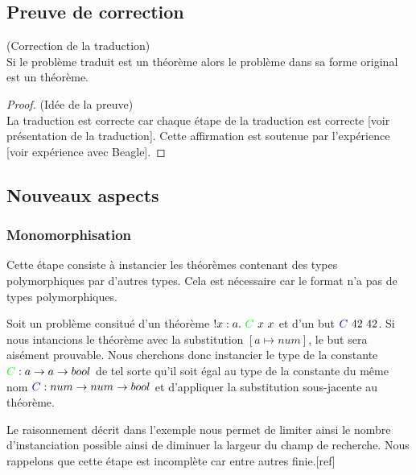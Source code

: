 \subsection{Preuve de correction}

\begin{thm}(Correction de la traduction)
\\Si le problème traduit est un théorème alors le problème dans sa forme original est un théorème.
\end{thm}

\begin{proof}(Idée de la preuve)
\\La traduction est correcte car chaque étape de la traduction est correcte [voir présentation de la traduction]. Cette affirmation est soutenue par l'expérience [voir expérience avec Beagle].
\end{proof}

\subsection{Nouveaux aspects}
\label{sec:traduction:nouveautes}

\subsubsection{Monomorphisation}
Cette étape consiste à instancier les théorèmes contenant des types polymorphiques par d'autres types. Cela est nécessaire car le format \tff n'a pas de types polymorphiques.
  
\begin{example}
Soit un problème consitué d'un théorème $!x:a.\ {\color{green}C}\ x\ x$ et d'un but ${\color{blue}C} \ 42\ 42$. Si nous intancions le théorème avec la substitution $[a \mapsto num]$, le but sera aisément prouvable.
Nous cherchons donc instancier le type de la constante ${\color{green}C} : a \rightarrow a \rightarrow bool$ de tel sorte qu'il soit égal au type de la constante du m\^eme nom ${\color{blue}C} : num \rightarrow num \rightarrow bool$ et d'appliquer la substitution sous-jacente au théorème.
\end{example}
 
\begin{remark}

\end{remark} 
  
Le raisonnement décrit dans l'exemple nous permet de limiter ainsi le nombre d'instanciation possible ainsi de diminuer la largeur du champ de recherche. Nous rappelons que cette étape est incomplète car entre autres finie.[ref]

